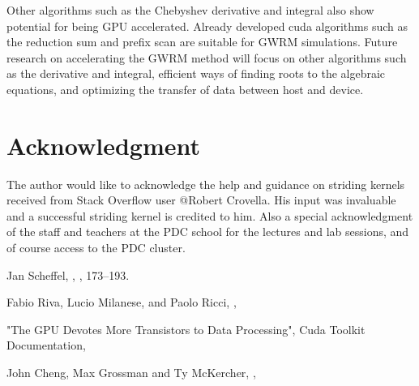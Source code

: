 \documentclass{article}
\begin{document}
Other algorithms such as the Chebyshev derivative and integral also show potential for being GPU accelerated. Already developed cuda algorithms such as the reduction sum and prefix scan are suitable for GWRM simulations. Future research on accelerating the GWRM method will focus on other algorithms such as the derivative and integral, efficient ways of finding roots to the algebraic equations, and optimizing the transfer of data between host and device.

\section*{Acknowledgment}
The author would like to acknowledge the help and guidance on striding kernels received from Stack Overflow user @Robert Crovella. His input was invaluable and a successful striding kernel is credited to him. Also a special acknowledgment of the staff and teachers at the PDC school for the lectures and lab sessions, and of course access to the PDC cluster.

  


\begin{thebibliography}{1}

Jan Scheffel,
,
, 173--193.

Fabio Riva, Lucio Milanese, and Paolo Ricci,
,

\newblock "The GPU Devotes More Transistors to Data Processing", Cuda Toolkit Documentation,

John Cheng, Max Grossman and Ty McKercher,
,


\end{thebibliography}
\end{document}
